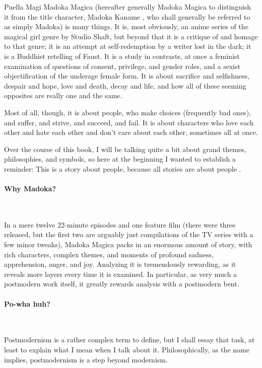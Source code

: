 Puella Magi Madoka Magica (hereafter generally Madoka Magica to distinguish it from the title character, Madoka Kaname \cite{ref1}, who shall generally be referred to as simply Madoka) is many things. It is, most obviously, an anime series of the magical girl genre by Studio Shaft, but beyond that it is a critique of and homage to that genre; it is an attempt at self-redemption by a writer lost in the dark; it is a Buddhist retelling of Faust. It is a study in contrasts, at once a feminist examination of questions of consent, privilege, and gender roles, and a sexist objectification of the underage female form. It is about sacrifice and selfishness, despair and hope, love and death, decay and life, and how all of these seeming opposites are really one and the same.

Most of all, though, it is about people, who make choices (frequently bad ones), and suffer, and strive, and succeed, and fail. It is about characters who love each other and hate each other and don't care about each other, sometimes all at once.

Over the course of this book, I will be talking quite a bit about grand themes, philosophies, and symbols, so here at the beginning I wanted to establish a reminder: This is a story about people, because all stories are about people \cite{ref2}. 
\paragraph{Why Madoka?}~{}

In a mere twelve 22-minute episodes and one feature film (there were three released, but the first two are arguably just compilations of the TV series with a few minor tweaks), Madoka Magica packs in an enormous amount of story, with rich characters, complex themes, and moments of profound sadness, apprehension, anger, and joy. Analyzing it is tremendously rewarding, as it reveals more layers every time it is examined. In particular, as very much a postmodern work itself, it greatly rewards analysis with a postmodern bent.
\paragraph{Po-wha huh?}~{}

Postmodernism is a rather complex term to define, but I shall essay that task, at least to explain what I mean when I talk about it. Philosophically, as the name implies, postmodernism is a step beyond modernism.

